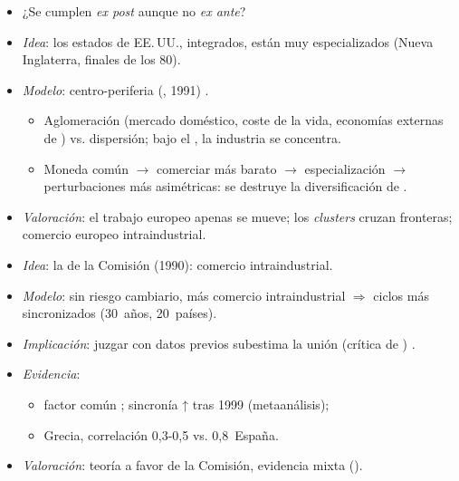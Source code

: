 \documentclass{article}
\begin{document}
\begin{columnas}
\begin{itemize}
\item ¿Se cumplen \emph{ex post} aunque no \emph{ex ante}?
\end{itemize}
\begin{itemize}
\item \emph{Idea}: los estados de EE.\,UU., integrados, están muy especializados (Nueva Inglaterra, finales de los 80).
\item \emph{Modelo}: centro-periferia (, 1991) .
  \begin{itemize}
  \item Aglomeración (mercado doméstico, coste de la vida, economías externas de ) vs. dispersión; bajo el , la industria se concentra.
  \item Moneda común $\to$ comerciar más barato $\to$ especialización $\to$ perturbaciones más asimétricas: se destruye la diversificación de .
  \end{itemize}
\item \emph{Valoración}: el trabajo europeo apenas se mueve; los \emph{clusters} cruzan fronteras; comercio europeo intraindustrial.
\end{itemize}
\begin{itemize}
\item \emph{Idea}: la de la Comisión (1990): comercio intraindustrial.
\item \emph{Modelo}: sin riesgo cambiario, más comercio intraindustrial $\Rightarrow$ ciclos más sincronizados (30~años, 20~países).
\item \emph{Implicación}: juzgar con datos previos subestima la unión (crítica de ) .
\item \emph{Evidencia}:
  \begin{itemize}
  \item factor común ; sincronía ↑ tras 1999 (metaanálisis);
  \item Grecia, correlación 0,3-0,5 vs. 0,8~España.
  \end{itemize}
\item \emph{Valoración}: teoría a favor de la Comisión, evidencia mixta ().
\end{itemize}


\end{columnas}
\end{document}
